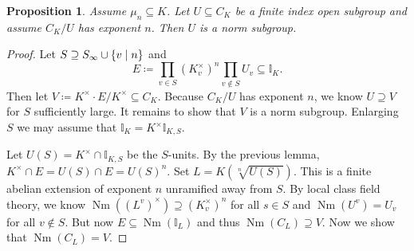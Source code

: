 \documentclass[leqno, openany]{memoir}
\newtheorem{prop}[thm]{Proposition}
\theoremstyle{definition}
\theoremstyle{remark}
\theoremstyle{plain}
\theoremstyle{definition}
\theoremstyle{remark}
\newcommand{\I}{\mathbb{I}}
\DeclareMathOperator{\Nm}{Nm}
\begin{document}
\begin{prop}
    Assume $\mu_n \subseteq K$. Let $U \subseteq C_K$ be a finite index open subgroup and assume $C_K/U$ has exponent $n$. Then $U$ is a norm subgroup.
\end{prop}

\begin{proof}
    Let $S \supseteq S_{\infty} \cup \qty{v \mid n}$ and 
    \[ E \coloneqq \prod_{v \in S} {(K_v^{\times})}^n \prod_{v \notin S} U_v \subseteq \I_K. \]
    Then let $V \coloneqq K^{\times} \cdot E / K^{\times} \subseteq C_K$. Because $C_K/U$ has exponent $n$, we know $U \supseteq V$ for $S$ sufficiently large. It remains to show that $V$ is a norm subgroup. Enlarging $S$ we may assume that $\I_K = K^{\times} \I_{K,S}$.

    Let $U(S) = K^{\times} \cap \I_{K,S}$ be the $S$-units. By the previous lemma, $K^{\times} \cap E = U(S) \cap E = {U(S)}^n$. Set $L = K(\sqrt[n]{U(S)})$. This is a finite abelian extension of exponent $n$ unramified away from $S$. By local class field theory, we know $\Nm({(L^v)}^{\times}) \supseteq {(K_v^{\times})}^n$ for all $s \in S$ and $\Nm(U^v) = U_v$ for all $v \notin S$. But now $E \subseteq \Nm(\I_L)$ and thus $\Nm(C_L) \supseteq V$. Now we show that $\Nm(C_L) = V$.


\end{proof}
\end{document}
